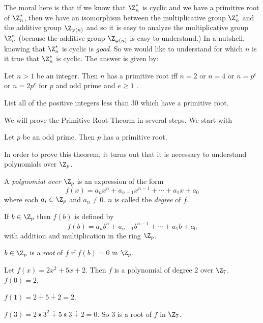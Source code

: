 \documentclass[oneside,12pt]{amsart}
\begin{document}
The moral here is that if we know that $\Z^*_n$ is cyclic and we have a primitive root of 
$\Z^*_n$, then we have an isomorphism between the multiplicative group $\Z^*_n$ and the additive group $\Z_{\varphi(n)}$ and so it is easy to analyze the multiplicative group $\Z^*_n$
(because the additive group $\Z_{\varphi(n)}$ is easy to understand.) In a nutshell, knowing that $\Z^*_n$ is cyclic is \emph{good}. So we would like to understand for which $n$ is
it true that $\Z^*_n$ is cyclic. The answer is given by:

\begin{theorem}
Let $n>1$ be an integer. Then $n$ has a primitive root iff $n=2$ or $n=4$ or $n=p^e$ or $n=2p^e$ for $p$ and odd prime and $e\geq 1$ .
\end{theorem}

\begin{homework}
List all of the positive integers less than 30 which have a primitive root.
\end{homework}

We will prove the Primitive Root Theorm in several steps. We start with

\begin{theorem}
Let $p$ be an odd prime. Then $p$ has a primitive root.
\end{theorem}

In order to prove this theorem, it turns out that it is necessary to understand polynomials over $\Z_p$.

\begin{definition}
A \emph{polynomial over $\Z_p$} is an expression of the form
$$f(x) = a_nx^n + a_{n-1}x^{n-1} + \cdots + a_1x + a_0$$
where each $a_i\in\Z_p$ and $a_n\not=0$. $n$ is called the \emph{degree} of $f$.

If $b\in\Z_p$ then $f(b)$ is defined by
$$f(b) = a_nb^n + a_{n-1}b^{n-1} + \cdots + a_1b + a_0$$
with addition and multiplication in the ring $\Z_p$.

$b\in\Z_p$ is a \emph{root} of $f$ if $f(b)=0$ in $\Z_p$.
\end{definition}

\begin{example}
Let $f(x)=2x^2 + 5x + 2$. Then $f$ is a polynomial of degree $2$ over $\Z_7$.
$f(0)=2$.

$f(1)=2\dotplus 5 \dotplus 2 = 2$.

$f(3) = 2\dottimes 3^2 \dotplus 5\dottimes 3 \dotplus 2 = 0$.
So $3$ is a root of $f$ in $\Z_7$.
\end{example}
\end{document}
